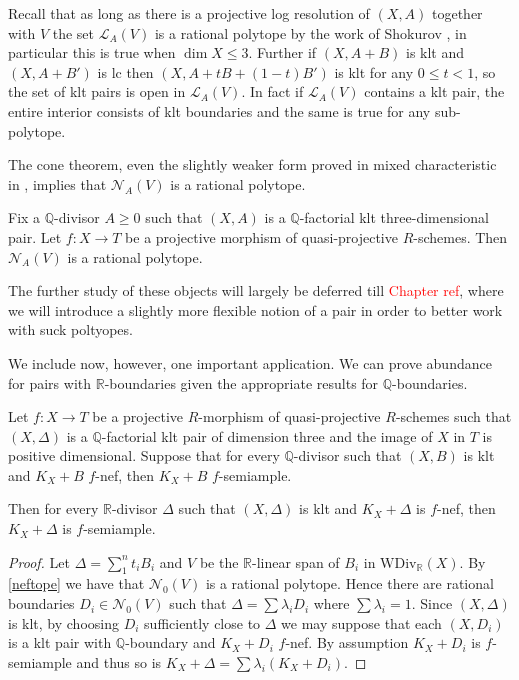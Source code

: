 \documentclass[a4paper,12pt]{book}
\newcommand\myworries[1]{\textcolor{red}{#1}}
\begin{document}
Recall that as long as there is a projective log resolution of $(X,A)$ together with $V$ the set $\mathcal{L}_{A}(V)$ is a rational polytope by the work of Shokurov \cite{Sho92}, in particular this is true when $\dim X \leq 3$. Further if $(X,A+B)$ is klt and $(X,A+B')$ is lc then $(X,A+tB+(1-t)B')$ is klt for any $0 \leq t < 1$, so the set of klt pairs is open in $\mathcal{L}_{A}(V)$. In fact if $\mathcal{L}_{A}(V)$ contains a klt pair, the entire interior consists of klt boundaries and the same is true for any sub-polytope.

The cone theorem, even the slightly weaker form proved in mixed characteristic in \cite{bhatt2020}, implies that $\mathcal{N}_{A}(V)$ is a rational polytope. 

\begin{lemma}\label{neftope} \cite[Proposition 9.31]{bhatt2020}
	Fix a $\mathbb{Q}$-divisor $A \geq 0$ such that $(X,A)$ is a $\mathbb{Q}$-factorial klt three-dimensional pair.
	Let $f\colon X \to T$ be a projective morphism of quasi-projective $R$-schemes.
	Then $\mathcal{N}_{A}(V)$ is a rational polytope.
\end{lemma}

The further study of these objects will largely be deferred till \myworries{Chapter ref}, where we will introduce a slightly more flexible notion of a pair in order to better work with suck poltyopes.

We include now, however, one important application. We can prove abundance for pairs with $\mathbb{R}$-boundaries given the appropriate results for $\mathbb{Q}$-boundaries.

\begin{proposition}\label{QtoR}
	Let $f \colon X \to T$ be a projective $R$-morphism of quasi-projective $R$-schemes such that $(X,\Delta)$ is a $\mathbb{Q}$-factorial klt pair of dimension three and the image of $X$ in $T$ is positive dimensional. 
	Suppose that for every $\mathbb{Q}$-divisor such that $(X,B)$ is klt and $K_{X}+B$ $f$-nef, then $K_{X}+B$ $f$-semiample.
	
	Then for every $\mathbb{R}$-divisor $\Delta$ such that $(X, \Delta)$ is klt and $K_X+\Delta$ is $f$-nef, then $K_X+\Delta$ is $f$-semiample.
\end{proposition}
\begin{proof}
	Let $\Delta= \sum_{1}^{n} t_{i}B_{i}$ and $V$ be the $\mathbb{R}$-linear span of $B_i$ in $\text{WDiv}_\mathbb{R}(X)$. By \autoref{neftope} we have that $\mathcal{N}_{0}(V)$ is a rational polytope. Hence there are rational boundaries $D_{i} \in \mathcal{N}_{0}(V)$ such that $\Delta=\sum \lambda_{i} D_{i}$ where $\sum \lambda_{i} =1$. Since $(X,\Delta)$ is klt, by choosing $D_{i}$ sufficiently close to $\Delta$ we may suppose that each $(X,D_{i})$ is a klt pair with $\mathbb{Q}$-boundary and $K_X+D_i$ $f$-nef. 
	By assumption $K_{X}+D_{i}$ is $f$-semiample and thus so is $K_{X}+\Delta=\sum \lambda_{i} (K_{X}+D_{i})$.
\end{proof}



\end{document}
